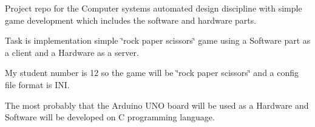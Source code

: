 Project repo for the Computer systems automated design discipline with simple game development which includes the software and hardware parts.

Task is implementation simple \char`\"{}rock paper scissors\char`\"{} game using a Software part as a client and a Hardware as a server.

My student number is 12 so the game will be \char`\"{}rock paper scissors\char`\"{} and a config file format is INI.

The most probably that the Arduino UNO board will be used as a Hardware and Software will be developed on C programming language. 